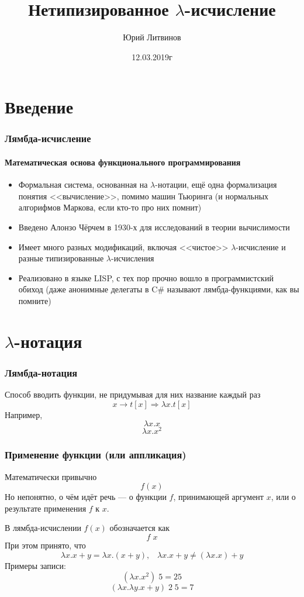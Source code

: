 \documentclass[xetex,mathserif,serif]{beamer}
\title{Нетипизированное $\lambda$-исчисление}
\author{Юрий Литвинов}
\date{12.03.2019г}
\begin{document}
	
	\frame{\titlepage}

	\section{Введение}
	
	\begin{frame}
		\frametitle{Лямбда-исчисление}
		\framesubtitle{Математическая основа функционального программирования}
		\begin{itemize}
			\item Формальная система, основанная на $\lambda$-нотации, ещё одна формализация
					понятия <<вычисление>>, помимо машин Тьюринга (и нормальных алгорифмов
					Маркова, если кто-то про них помнит)
			\item Введено Алонзо Чёрчем в 1930-х для исследований в теории вычислимости
			\item Имеет много разных модификаций, включая <<чистое>> $\lambda$-исчисление и
					разные типизированные $\lambda$-исчисления
			\item Реализовано в языке LISP, с тех пор прочно вошло в программистский обиход
					(даже анонимные делегаты в C\# называют лямбда-функциями, как вы помните)
		\end{itemize}
	\end{frame}
		
	\section{$\lambda$-нотация}
		
	\begin{frame}
		\frametitle{Лямбда-нотация}
		Способ вводить функции, не придумывая для них название каждый раз
		$$x \rightarrow t[x] \Longrightarrow \lambda x.t[x]$$
		Например,
		$$\lambda x.x$$
		$$\lambda x.x^2$$
	\end{frame}

	\begin{frame}
		\frametitle{Применение функции (или аппликация)}
		Математически привычно
		$$f(x)$$
		Но непонятно, о чём идёт речь --- о функции $f$, принимающей аргумент $x$, или о результате применения
		$f$ к $x$. 

		В лямбда-исчислении $f(x)$ обозначается как
		$$f \; x$$
		При этом принято, что
		$$\lambda x. x + y = \lambda x.(x + y), \;\;\; 
		\lambda x. x + y \neq (\lambda x.x) + y$$
		Примеры записи:
		$$(\lambda x.x^2) \; 5 = 25$$
		$$(\lambda x.\lambda y.x + y) \; 2 \; 5 = 7$$
	\end{frame}
\end{document}
